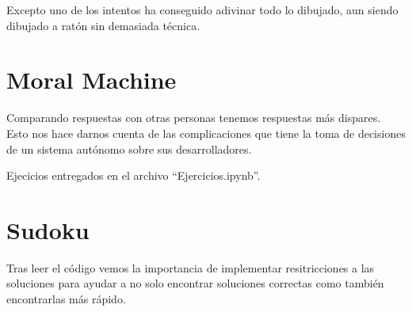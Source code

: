 \documentclass[twoside]{AiTeX}
\begin{document}
Excepto uno de los intentos ha conseguido adivinar todo lo dibujado, aun siendo dibujado a ratón sin demasiada técnica.

\section{Moral Machine}

Comparando respuestas con otras personas tenemos respuestas más dispares. Esto nos hace darnos cuenta de las complicaciones que tiene la toma de decisiones de un sistema autónomo sobre sus desarrolladores.


Ejecicios entregados en el archivo ``Ejercicios.ipynb''.


\section{Sudoku}

Tras leer el código vemos la importancia de implementar resitricciones a las soluciones para ayudar a no solo encontrar soluciones correctas como también encontrarlas más rápido.


\printglossary[title={Glosario}]
\end{document}
